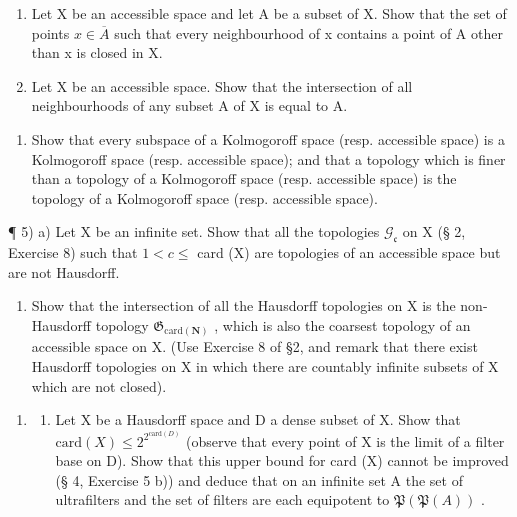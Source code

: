\begin{enumerate}
\def\labelenumi{\alph{enumi})}
\setcounter{enumi}{1}
\item
  Let X be an accessible space and let A be a subset of X. Show that the set of points \(x \in \overline{A}\) such that every neighbourhood of x contains a point of A other than x is closed in X.
\item
  Let X be an accessible space. Show that the intersection of all neighbourhoods of any subset A of X is equal to A.
\end{enumerate}

\begin{enumerate}
\def\labelenumi{\arabic{enumi})}
\setcounter{enumi}{3}
\tightlist
\item
  Show that every subspace of a Kolmogoroff space (resp. accessible space) is a Kolmogoroff space (resp. accessible space); and that a topology which is finer than a topology of a Kolmogoroff space (resp. accessible space) is the topology of a Kolmogoroff space (resp. accessible space).
\end{enumerate}

¶ 5) a) Let X be an infinite set. Show that all the topologies \(\mathcal{G}_{\mathfrak{c}}\) on X (§ 2, Exercise 8) such that \(1 < c \leqslant\) card (X) are topologies of an accessible space but are not Hausdorff.

\begin{enumerate}
\def\labelenumi{\alph{enumi})}
\setcounter{enumi}{1}
\tightlist
\item
  Show that the intersection of all the Hausdorff topologies on X is the non-Hausdorff topology \(\mathfrak{G}_{\mathrm{card}(\mathbf{N})}\) , which is also the coarsest topology of an accessible space on X. (Use Exercise 8 of §2, and remark that there exist Hausdorff topologies on X in which there are countably infinite subsets of X which are not closed).
\end{enumerate}

\begin{enumerate}
\def\labelenumi{\arabic{enumi})}
\setcounter{enumi}{5}
\tightlist
\item
  \begin{enumerate}
  \def\labelenumii{\alph{enumii})}
  \tightlist
  \item
    Let X be a Hausdorff space and D a dense subset of X. Show that \(\text{card}(X) \leqslant 2^{2^{\text{card}(D)}}\) (observe that every point of X is the limit of a filter base on D). Show that this upper bound for card (X) cannot be improved (§ 4, Exercise 5 b)) and deduce that on an infinite set A the set of ultrafilters and the set of filters are each equipotent to \(\mathfrak{P}(\mathfrak{P}(A))\) .
  \end{enumerate}
\end{enumerate}

